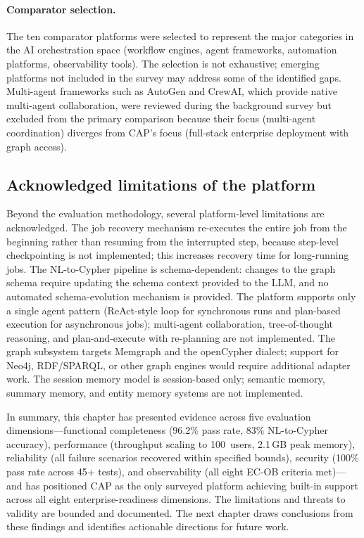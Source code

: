 \documentclass[a4paper]{sapthesis}
\begin{document}
\paragraph{Comparator selection.}
The ten comparator platforms were selected to represent the major
categories in the AI orchestration space (workflow engines, agent
frameworks, automation platforms, observability tools).  The selection
is not exhaustive; emerging platforms not included in the survey may
address some of the identified gaps.  Multi-agent frameworks such as
AutoGen and CrewAI, which provide native multi-agent collaboration,
were reviewed during the background survey but excluded from the
primary comparison because their focus (multi-agent coordination)
diverges from CAP's focus (full-stack enterprise deployment with graph
access).

\subsection{Acknowledged limitations of the platform}

Beyond the evaluation methodology, several platform-level limitations
are acknowledged.  The job recovery mechanism re-executes the entire
job from the beginning rather than resuming from the interrupted step,
because step-level checkpointing is not implemented; this increases
recovery time for long-running jobs.  The NL-to-Cypher pipeline is
schema-dependent: changes to the graph schema require updating the
schema context provided to the LLM, and no automated schema-evolution
mechanism is provided.  The platform supports only a single agent
pattern (ReAct-style loop for synchronous runs and plan-based
execution for asynchronous jobs); multi-agent collaboration,
tree-of-thought reasoning, and plan-and-execute with re-planning are
not implemented.  The graph subsystem targets Memgraph and the
openCypher dialect; support for Neo4j, RDF/SPARQL, or other graph
engines would require additional adapter work.  The session memory
model is session-based only; semantic memory, summary memory, and
entity memory systems are not implemented.

\medskip
\noindent
In summary, this chapter has presented evidence across five evaluation
dimensions---functional completeness (96.2\% pass rate, 83\%
NL-to-Cypher accuracy), performance (throughput scaling to 100~users,
2.1\,GB peak memory), reliability (all failure scenarios recovered
within specified bounds), security (100\% pass rate across 45+ tests),
and observability (all eight EC-OB criteria met)---and has positioned
CAP as the only surveyed platform achieving built-in support across all
eight enterprise-readiness dimensions.  The limitations and threats to
validity are bounded and documented.  The next chapter draws
conclusions from these findings and identifies actionable directions for
future work.
\end{document}
